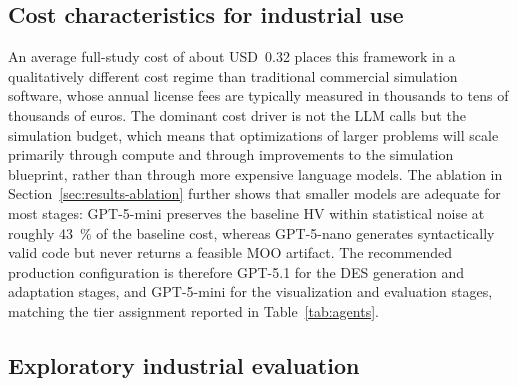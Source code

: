 \documentclass[a4paper,fleqn]{cas-sc}
\begin{document}
  \subsection{Cost characteristics for industrial use}\label{sec:discussion-cost}                                       
  
  An average full-study cost of about USD~0.32 places this framework in a qualitatively different cost regime than        
  traditional commercial simulation software, whose annual license fees are typically measured in thousands to tens of
  thousands of euros. The dominant cost driver is not the LLM calls but the simulation budget, which means that         
  optimizations of larger problems will scale primarily through compute and through improvements to the simulation
  blueprint, rather than through more expensive language models. The ablation in Section~\ref{sec:results-ablation}
  further shows that smaller models are adequate for most stages: GPT-5-mini preserves the baseline HV within
  statistical noise at roughly 43~\% of the baseline cost, whereas GPT-5-nano generates syntactically valid code but
  never returns a feasible MOO artifact. The recommended production configuration is therefore GPT-5.1 for the DES
  generation and adaptation stages, and GPT-5-mini for the visualization and evaluation stages, matching the tier
  assignment reported in Table~\ref{tab:agents}.

  \subsection{Exploratory industrial evaluation}\label{sec:discussion-industry}\label{sec:discussion-industry}                                                    
  
\end{document}
